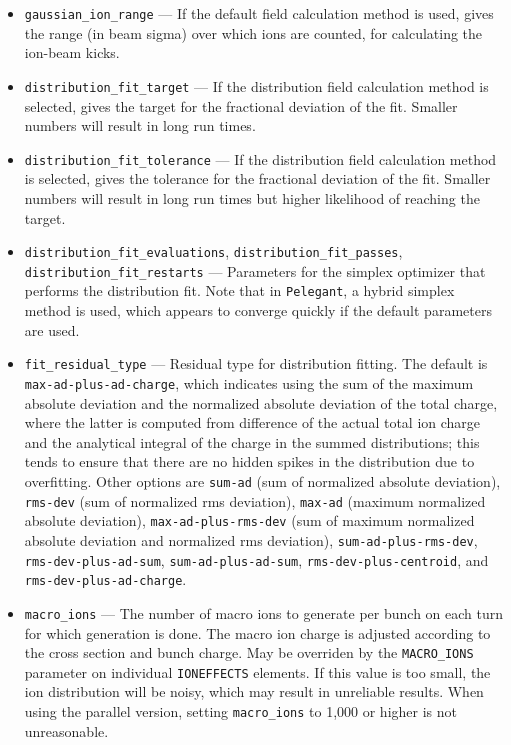 \documentclass[11pt]{article}
\begin{document}
\begin{itemize}
\item \verb|gaussian_ion_range| --- If the default field calculation method is used, gives the range (in beam sigma) over which ions are counted, for calculating the ion-beam kicks.
\item \verb|distribution_fit_target| --- If the distribution field calculation method is selected, gives the target for the
  fractional deviation of the fit. Smaller numbers will result in long run times.
\item \verb|distribution_fit_tolerance| --- If the distribution field calculation method is selected, gives the tolerance for the
  fractional deviation of the fit. Smaller numbers will result in long run times but higher likelihood of reaching the target.
\item \verb|distribution_fit_evaluations|, \verb|distribution_fit_passes|, \verb|distribution_fit_restarts| --- Parameters
  for the simplex optimizer that performs the distribution fit. Note that in \verb|Pelegant|, a hybrid simplex method is
  used, which appears to converge quickly if the default parameters are used.
\item \verb|fit_residual_type| --- Residual type for distribution fitting. The default is \verb|max-ad-plus-ad-charge|, which
  indicates using the sum of the maximum absolute deviation and the normalized absolute deviation of the total charge, where
  the latter is computed from difference of the actual total ion charge and the analytical integral of the charge 
  in the summed distributions; this tends to ensure that there are no hidden spikes in the distribution due to overfitting.
  Other options are \verb|sum-ad| (sum of normalized absolute deviation), \verb|rms-dev| (sum of normalized rms deviation),
  \verb|max-ad| (maximum normalized absolute deviation), \verb|max-ad-plus-rms-dev| (sum of maximum normalized absolute 
  deviation and normalized rms deviation), \verb|sum-ad-plus-rms-dev|, \verb|rms-dev-plus-ad-sum|, \verb|sum-ad-plus-ad-sum|,
  \verb|rms-dev-plus-centroid|, and \verb|rms-dev-plus-ad-charge|.
\item \verb|macro_ions| --- The number of macro ions to generate per bunch on each turn for which generation is done. 
  The macro ion charge is adjusted
  according to the cross section and bunch charge. May be overriden by the \verb|MACRO_IONS| parameter on individual
  \verb|IONEFFECTS| elements.
  If this value is too small, the ion distribution will be noisy, which may result in unreliable results.
  When using the parallel version, setting \verb|macro_ions| to 1,000 or higher is not unreasonable.

\end{itemize}
\end{document}
